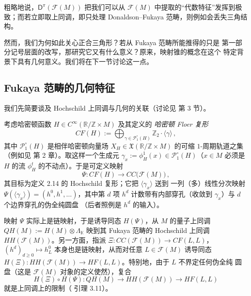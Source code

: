 
粗略地说，$\mathsf D^\pi(\mathcal F(M))$ 把我们可以从 $\mathcal F(M)$
中提取的“代数特征”发挥到极致；而若立即取上同调，即只处理
Donaldson--Fukaya 范畴，则例如会丢失三角结构。

然而，我们为何如此关心正合三角形？若从 Fukaya 范畴所能推得的只是
第一部分记号层面的改写，那研究它又有什么意义？原来，映射锥的概念在这个
特定背景下具有几何意义。我们将在下一节讨论这一点。

\subsection{Fukaya 范畴的几何特征}\label{sec:6.4}

我们先简要谈及 Hochschild 上同调与几何的关联（讨论见 \cite{AS09} 第 3 节）。

\begin{Rem}\label{rem:6.18}
考虑哈密顿函数 $H\in C^\infty(\mathbb R/\mathbb Z\times M)$ 及其定义的
\emph{哈密顿 Floer 复形}
\[
CF(H):=\bigoplus_{\gamma\in\mathcal P^\circ_1(H)}\mathbb Z_2\cdot\langle\gamma\rangle\,,
\]
其中 $\mathcal P^\circ_1(H)$ 是相伴哈密顿向量场
$X_H\in\mathfrak X(\mathbb R/\mathbb Z\times M)$ 的可缩 $1$-周期轨道之集
（例如见 \cite{Mer14} 第 2 章）。取这样一个生成元
$\gamma_x:=\phi^1_H(x)\in\mathcal P^\circ_1(H)$（$x\in M$ 必须是 $H$ 的流
$\phi^t_H$ 的不动点）。于是可定义映射
\[
\Psi:CF(H)\to CC\bigl(\mathcal F(M)\bigr)\,,
\]
其目标为定义 2.14 的 Hochschild 复形；它把 $\langle\gamma_x\rangle$ 送到
一列（多）线性分次映射
$\Psi(\langle\gamma_x\rangle)=(h^0,h^1,\dots)$，其中第 $d$ 项 $h^d$
计数带有内部穿孔（收敛到 $\gamma_x$）与 $d$ 个边界穿孔的伪全纯圆盘
（后者照例是 $h^d$ 的输入）。

映射 $\Psi$ 实际上是链映射，于是诱导同态 $H(\Psi)$，从 $M$ 的量子上同调
$QH(M):=H(M)\otimes\Lambda_{\mathbb K}$ 映到其 Fukaya 范畴的 Hochschild
上同调 $HH(\mathcal F(M))$。另一方面，指派
$\Xi:CC(\mathcal F(M))\to CF(L,L)$，$(h^d)_{d\ge 0}\mapsto h^0_L$
本身也是链映射，从而对任意 $L\in\mathcal F(M)$ 诱导同态
$H(\Xi):HH(\mathcal F(M))\to HF(L,L)$。特别地，由于 $L$ 不界定任何伪全纯
圆盘（这是 $\mathcal F(M)$ 对象的定义使然），复合
\[
H(\Xi)\circ H(\Psi):QH(M)\to HH(\mathcal F(M))\to HF(L,L)
\]
就是上同调上的限制（\cite{AS09} 引理 3.11）。
\end{Rem}

